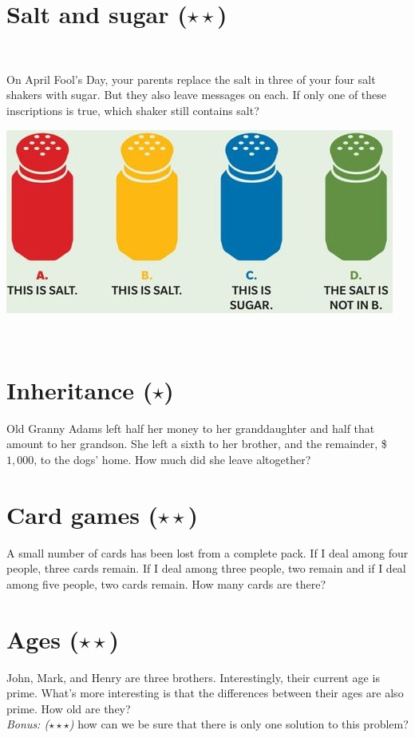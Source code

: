\documentclass[11pt]{article}
\begin{document}
\section{Salt and sugar ($\star\star$)}~\\[-12mm]
\begin{minipage}{.5\textwidth}
  On April Fool’s Day, your parents replace the salt in three of your four
  salt shakers with sugar. But they also leave messages on each.
  If only one of these inscriptions is true, which shaker still contains salt?
\end{minipage}
\begin{minipage}{.5\textwidth}
\begin{center}
  \includegraphics[width=\textwidth]{salt.jpg}
\end{center}
\end{minipage}\\[-10mm]

\section{Inheritance ($\star$)}
\noindent Old Granny Adams left half her money to her granddaughter and half
that amount to her grandson. She left a sixth to her brother, and the remainder,
\$$1,000$, to the dogs’ home. How much did she leave altogether?

\section{Card games ($\star\star$)}
\noindent A small number of cards has been lost from a complete pack. If I deal
among four people, three cards remain. If I deal among three people, two remain
and if I deal among five people, two cards remain. How many cards are there?

\section{Ages ($\star\star$)}
\noindent John, Mark, and Henry are three brothers. Interestingly, their current age is
prime. What’s more interesting is that the differences between their ages are
also prime. How old are they?\\
\emph{Bonus: ($\star\star\star$)} how can we be sure that there is only one solution
to this problem?
\end{document}
